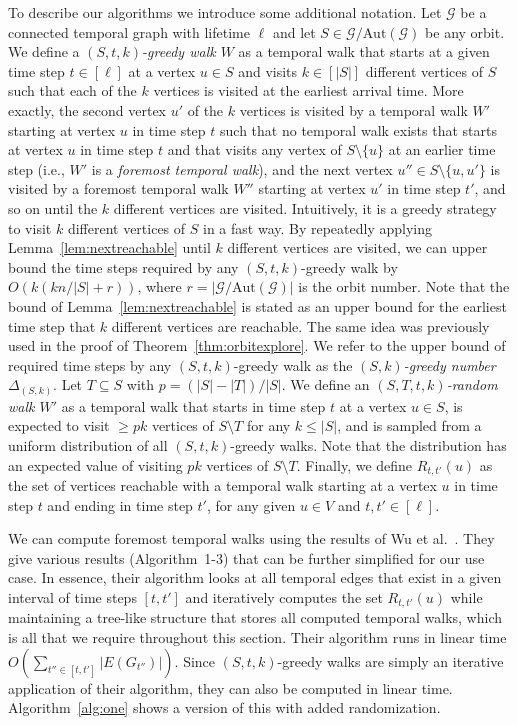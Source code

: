 \documentclass[10pt,a4paper]{article}
\newcommand{\auttg}{\ensuremath{\text{Aut}(\mathcal{G})}}
\newcommand{\torb}{\ensuremath{\mathcal{G}/\auttg}}
\begin{document}
{To describe our algorithms we introduce some additional notation. Let
$\mathcal{G}$ be a connected temporal graph with lifetime $\ell$ and let $S \in
\torb$ be any orbit.  We define a
\emph{$(S, t, k)$-greedy walk $W$} as a temporal walk that starts at a given
time step {$t \in [\ell]$} at a vertex $u \in S$ and visits {$k \in [|S|]$} different vertices of
{$S$ such that each of the $k$ vertices is visited at the earliest
arrival time. More exactly, the second vertex $u'$} of the $k$ vertices is visited
by a temporal walk $W'$ starting at vertex $u$ in time step $t$ such that no
temporal walk exists that starts at vertex $u$ in time step $t$ and that visits
any vertex of $S \setminus \{u\}$ at an earlier time step (i.e., $W'$ is a {\em
foremost temporal walk}), and the next vertex $u'' \in S \setminus \{u, u'\}$ is
visited by a foremost temporal walk $W''$ starting at vertex $u'$ in time step
$t'$, and so on until the $k$ different vertices are visited. Intuitively, it is
a greedy strategy to visit $k$ different vertices of $S$ in a fast way. By
repeatedly applying Lemma~\ref{lem:nextreachable} until $k$ different vertices
are visited, we can upper bound the time steps required by any $(S, t,
k)$-greedy walk by $O(k(k n/|S| + r))$, where $r=|\torb|$ is the orbit number. 
{Note that the bound of Lemma~\ref{lem:nextreachable} is stated
as an upper bound for the earliest time step that $k$ different vertices are
reachable. The same idea}
was previously used in the proof of Theorem~\ref{thm:orbitexplore}. 
%
We refer to the upper bound of required time steps by any $(S, t, k)$-greedy walk
as the \emph{$(S, k)$-greedy number $\Delta_{(S, k)}$}. 
{Let $T \subseteq S$ with $p=(|S|-|T|)/|S|$.}
We define an
\emph{$(S, T, t, k)$-random walk $W'$} as a temporal walk that starts in time
step $t$ at a vertex $u \in S$, is expected to visit $\geq p k$ vertices of $S
\setminus T$ for any $k \leq |S|$, and is sampled from a
uniform distribution of all $(S, t, k)$-greedy walks. Note that the distribution has
an expected value of visiting $p k$ vertices of $S \setminus T$. Finally, we
define $R_{t, t'}(u)$ as the set of vertices reachable with a temporal walk
starting at a {vertex $u$} in time step $t$ and ending in time step $t'$,
for any given {$u \in V$  and} $t, t' \in [\ell]$.

We can compute foremost temporal walks using the results of Wu et
al.~\cite{WuCYSYW16}. They give various results (Algorithm~1-3) that can be
further simplified for our use case. In essence, their algorithm looks at all
temporal edges that exist in a given interval of time steps $[t, t']$ and
iteratively computes the set $R_{t, t'}(u)$ while maintaining a tree-like
structure that stores all computed temporal walks, which is all that we require
throughout this section. Their algorithm runs in linear time $O(\sum_{t'' \in
[t, t']} |E(G_{t''})|)$. Since $(S, t, k)$-greedy walks are simply an iterative
application of {their} algorithm, they can also be computed in linear time.
Algorithm~\ref{alg:one} shows a version of this with added randomization.

}
\end{document}
